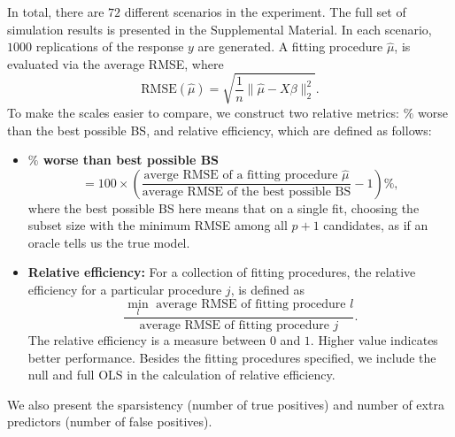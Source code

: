 In total, there are $72$ different scenarios in the experiment. The full set of simulation results is presented in the Supplemental Material. In each scenario, $1000$ replications of the response $y$ are generated. A fitting procedure $\hat{\mu}$, is evaluated via the average RMSE, where 
\begin{equation}
\text{RMSE}(\hat{\mu}) = \sqrt{ \frac{1}{n} \lVert \hat{\mu}-X\beta \rVert_2^2}.
\label{eq:l2_loss}
\end{equation}
To make the scales easier to compare, we construct two relative metrics: $\%$ worse than the best possible BS, and relative efficiency, which are defined as follows:
\begin{itemize}
	\item \textbf{$\%$ worse than best possible BS}
	\begin{equation} 
	=\displaystyle 100 \times \left( \frac{\text{averge RMSE of a fitting procedure } \hat{\mu}}{\text{average RMSE of the best possible BS}} - 1 \right) \%,
	\end{equation}
	where the best possible BS here means that on a single fit, choosing the subset size with the minimum RMSE among all $p+1$ candidates, as if an oracle tells us the true model.
	
	\item \textbf{Relative efficiency:} For a collection of fitting procedures, the relative efficiency for a particular procedure $j$, is defined as
	\begin{equation}
	\displaystyle \frac{\min_l \text{ average RMSE of fitting procedure }l}{\text{average RMSE of fitting procedure }j}.
	\end{equation}
	The relative efficiency is a measure between $0$ and $1$. Higher value indicates better performance. Besides the fitting procedures specified, we include the null and full OLS in the calculation of relative efficiency. 
\end{itemize}
We also present the sparsistency (number of true positives) and number of extra predictors (number of false positives). 


